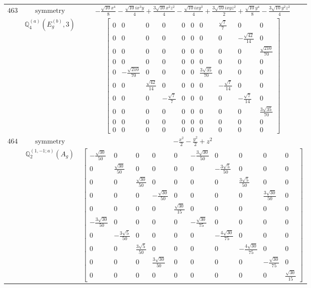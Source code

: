 \documentclass[fleqn,8pt,landscape]{jsarticle}
\begin{document}
\begin{longtable}{ccc}
$ 463 $ & $ \text{symmetry} $ & $ - \frac{\sqrt{10} x^{4}}{8} - \frac{\sqrt{10} i x^{3} y}{4} + \frac{3 \sqrt{10} x^{2} z^{2}}{4} - \frac{\sqrt{10} i x y^{3}}{4} + \frac{3 \sqrt{10} i x y z^{2}}{2} + \frac{\sqrt{10} y^{4}}{8} - \frac{3 \sqrt{10} y^{2} z^{2}}{4} $ \\
$  $ & $ \mathbb{Q}_{4}^{(a)}(E_{g}^{(b)},3) $ & $ \begin{bmatrix} 0 & 0 & 0 & 0 & 0 & 0 & 0 & \frac{\sqrt{7}}{7} & 0 & 0 \\ 0 & 0 & 0 & 0 & 0 & 0 & 0 & 0 & - \frac{\sqrt{42}}{14} & 0 \\ 0 & 0 & 0 & 0 & 0 & 0 & 0 & 0 & 0 & \frac{\sqrt{210}}{70} \\ 0 & 0 & 0 & 0 & 0 & 0 & 0 & 0 & 0 & 0 \\ 0 & - \frac{\sqrt{210}}{70} & 0 & 0 & 0 & 0 & \frac{3 \sqrt{35}}{70} & 0 & 0 & 0 \\ 0 & 0 & \frac{\sqrt{42}}{14} & 0 & 0 & 0 & 0 & - \frac{\sqrt{7}}{14} & 0 & 0 \\ 0 & 0 & 0 & - \frac{\sqrt{7}}{7} & 0 & 0 & 0 & 0 & - \frac{\sqrt{7}}{14} & 0 \\ 0 & 0 & 0 & 0 & 0 & 0 & 0 & 0 & 0 & \frac{3 \sqrt{35}}{70} \\ 0 & 0 & 0 & 0 & 0 & 0 & 0 & 0 & 0 & 0 \\ 0 & 0 & 0 & 0 & 0 & 0 & 0 & 0 & 0 & 0 \end{bmatrix} $ \\ \hline
$ 464 $ & $ \text{symmetry} $ & $ - \frac{x^{2}}{2} - \frac{y^{2}}{2} + z^{2} $ \\
$  $ & $ \mathbb{Q}_{2}^{(1,-1;a)}(A_{g}) $ & $ \begin{bmatrix} - \frac{\sqrt{30}}{50} & 0 & 0 & 0 & 0 & - \frac{3 \sqrt{30}}{50} & 0 & 0 & 0 & 0 \\ 0 & \frac{\sqrt{30}}{50} & 0 & 0 & 0 & 0 & - \frac{3 \sqrt{5}}{50} & 0 & 0 & 0 \\ 0 & 0 & \frac{\sqrt{30}}{50} & 0 & 0 & 0 & 0 & \frac{3 \sqrt{5}}{50} & 0 & 0 \\ 0 & 0 & 0 & - \frac{\sqrt{30}}{50} & 0 & 0 & 0 & 0 & \frac{3 \sqrt{30}}{50} & 0 \\ 0 & 0 & 0 & 0 & \frac{\sqrt{30}}{15} & 0 & 0 & 0 & 0 & 0 \\ - \frac{3 \sqrt{30}}{50} & 0 & 0 & 0 & 0 & - \frac{\sqrt{30}}{75} & 0 & 0 & 0 & 0 \\ 0 & - \frac{3 \sqrt{5}}{50} & 0 & 0 & 0 & 0 & - \frac{4 \sqrt{30}}{75} & 0 & 0 & 0 \\ 0 & 0 & \frac{3 \sqrt{5}}{50} & 0 & 0 & 0 & 0 & - \frac{4 \sqrt{30}}{75} & 0 & 0 \\ 0 & 0 & 0 & \frac{3 \sqrt{30}}{50} & 0 & 0 & 0 & 0 & - \frac{\sqrt{30}}{75} & 0 \\ 0 & 0 & 0 & 0 & 0 & 0 & 0 & 0 & 0 & \frac{\sqrt{30}}{15} \end{bmatrix} $ \\ \hline

\end{longtable}
\end{document}
